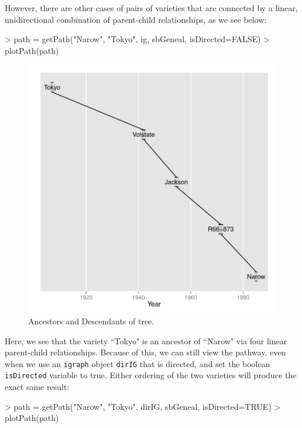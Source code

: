 \documentclass{article}
\numberwithin{equation}{section} %
\begin{document}
However, there are other cases of pairs of varieties that are connected by a linear, unidirectional combination of parent-child relationships, as we see below:

\begin{Schunk}
\begin{Sinput}
> path = getPath("Narow", "Tokyo", ig, sbGeneal, isDirected=FALSE)
> plotPath(path)
\end{Sinput}
\end{Schunk}

\begin{figure} 
  \begin{center} 
\includegraphics{ggenealogy-plotPath2}
\end{center} 
\caption{Ancestors and Descendants of tree.}
\label{fig:plotPath2}
\end{figure}

Here, we see that the variety ``Tokyo" is an ancestor of ``Narow" via four linear parent-child relationships. Because of this, we can still view the pathway, even when we use an \texttt{igraph} object \texttt{dirIG} that is directed, and set the boolean \texttt{isDirected} variable to true. Either ordering of the two varieties will produce the exact same result:

\begin{Schunk}
\begin{Sinput}
> path = getPath("Narow", "Tokyo", dirIG, sbGeneal, isDirected=TRUE)
> plotPath(path)
\end{Sinput}
\end{Schunk}
\end{document}
